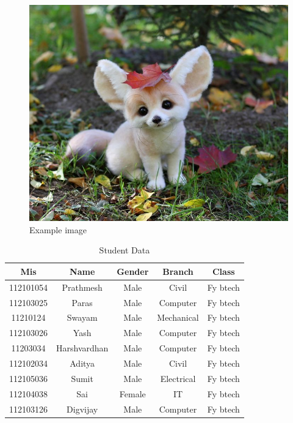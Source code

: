 \documentclass{article}
\begin{document}
	
	\begin{figure}[h]
		\centering
		\includegraphics[width=\linewidth]{cute.jpeg}
		\caption{Example image}
	\end{figure}
	

	
\begin{table}
	\label{table}
	\centering
	\caption{Student Data}
	\begin{tabular}{c|c|c|c|c}
		\hline
		\textbf{Mis}& \textbf{Name}&\textbf{Gender} &\textbf{Branch}& \textbf{Class} \\
		\hline
		112101054 & Prathmesh & Male & Civil & Fy btech\\
		\hline
		112103025 & Paras & Male & Computer & Fy btech\\
		\hline
		11210124 & Swayam & Male & Mechanical & Fy btech\\
		\hline
		112103026 & Yash & Male & Computer & Fy btech\\
		\hline
		11203034 & Harshvardhan & Male & Computer & Fy btech\\
		\hline
		112102034 & Aditya & Male & Civil & Fy btech\\
		\hline
		112105036 & Sumit & Male & Electrical & Fy btech\\
		\hline
		112104038 & Sai & Female & IT & Fy btech\\
		\hline
		112103126 & Digvijay & Male & Computer & Fy btech\\
	\end{tabular}
\end{table}
	
\end{document}
